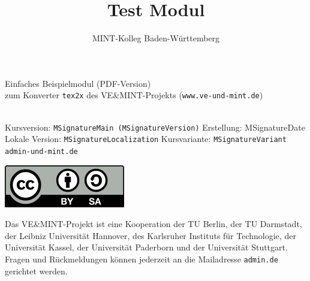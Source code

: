 
\title{Test Modul}
\author{MINT-Kolleg Baden-W\"urttemberg}



\MSetSubject{\MINTMathematics}

\begin{framed}
\begin{center}
\LARGE
Einfaches Beispielmodul (PDF-Version)\\
\large
zum Konverter \texttt{tex2x} des VE\&MINT-Projekts (\texttt{www.ve-und-mint.de})
\end{center}
\ \\

Kursversion:  \texttt{MSignatureMain (MSignatureVersion)}
Erstellung:  MSignatureDate\\
Lokale Version:  \texttt{MSignatureLocalization}
Kursvariante: \texttt{MSignatureVariant}\\
\scriptsize \texttt{admin\@@ve-und-mint.de}
\end{framed}


\begin{center}
\includegraphics[scale=0.45]{../static/cclbysa.png}
\end{center}


Das VE\&MINT-Projekt ist eine Kooperation der TU Berlin, der TU Darmstadt, der Leibniz Universität Hannover, des Karlsruher
Instituts für Technologie, der Universität Kassel, der Universität Paderborn und der Universität Stuttgart.
Fragen und Rückmeldungen können jederzeit an die Mailadresse \texttt{admin\@@veundmint.de} gerichtet werden.

\Mtableofcontents



\MPrintIndex


